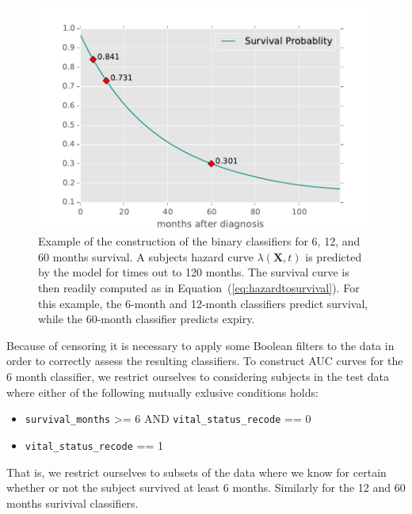 \documentclass[a4paper,11pt]{article}
\newcommand{\codewhite}[1]{\colorbox{white}{\texttt{#1}}}
\begin{document}
\begin{figure}[H]
\centering 
\begin{center}
\includegraphics[width=.90\textwidth,origin=c]{survivalexample.pdf}
\caption{\label{fig:survivalexample} Example of the construction of the binary classifiers for 6, 12, and 60 months survival.
A subjects hazard curve $\lambda(\mathbf{X}, t)$ is predicted by the model for times out to 120 months. The survival curve is then readily computed as in Equation~(\ref{eq:hazardtosurvival}). For this example, the 6-month and 12-month classifiers predict survival, while the 60-month classifier predicts expiry.}
\end{center}
\end{figure}


Because of censoring it is necessary to apply some Boolean filters to the data in order to correctly assess the resulting classifiers.
To construct AUC curves for the 6 month classifier, we restrict ourselves to considering
subjects in the test data where either of the following mutually exlusive conditions holds:

\begin{itemize}[noitemsep]
\item \codewhite{survival\_months} >= 6 AND \codewhite{vital\_status\_recode} == 0
\item \codewhite{vital\_status\_recode} == 1
\end{itemize}

That is, we restrict ourselves to subsets of the data where we know for certain whether or not the subject survived at least 6 months. Similarly for the 12 and 60 months surivival classifiers. 
\end{document}
